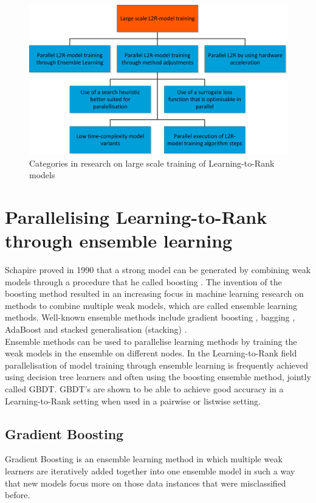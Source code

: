 \begin{figure}
\includegraphics{gfx/related_work_categories}
\caption{Categories in research on large scale training of  Learning-to-Rank models}
\label{fig:related_work_categories}
\end{figure}

\section{Parallelising Learning-to-Rank through ensemble learning}
Schapire proved in 1990 that a strong model can be generated by combining weak models through a procedure that he called boosting \cite{Schapire1990}. The invention of the boosting method resulted in an increasing focus in machine learning research on methods to combine multiple weak models, which are called ensemble learning methods. Well-known ensemble methods include gradient boosting \cite{Friedman2001}, bagging \cite{Breiman1996}, AdaBoost \cite{Freund1997} and stacked generalisation (stacking) \cite{Wolpert1992}.\\

Ensemble methods can be used to parallelise learning methods by training the weak models in the ensemble on different nodes. In the Learning-to-Rank field parallelisation of model training through ensemble learning is frequently achieved using decision tree learners and often using the boosting ensemble method, jointly called \acf{GBDT}. \ac{GBDT}'s are shown to be able to achieve good accuracy in a Learning-to-Rank setting when used in a pairwise \cite{Zheng2007} or listwise \cite{Chen2008} setting.

\subsection{Gradient Boosting}
Gradient Boosting \cite{Friedman2001} is an ensemble learning method in which multiple weak learners are iteratively added together into one ensemble model in such a way that new models focus more on those data instances that were misclassified before.\\

